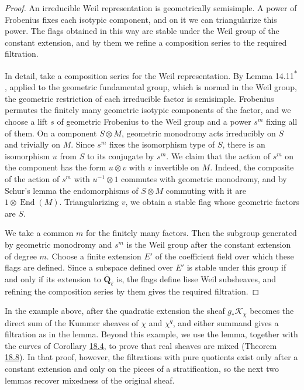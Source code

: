 \documentclass[11pt]{article}
\newcommand{\bpout}[1]{#1\textsuperscript{\hyperlink{bp-outside}{\ensuremath{\ast}}}}
\begin{document}
\begin{proof}[{Proof}]\label{bp19}%
An irreducible Weil representation is geometrically semisimple. A power of Frobenius fixes each isotypic component, and on it we can triangularize this power. The flags obtained in this way are stable under the Weil group of the constant extension, and by them we refine a composition series to the required filtration.

In detail, take a composition series for the Weil representation. By Lemma \bpout{14.11}, applied to the geometric fundamental group, which is normal in the Weil group, the geometric restriction of each irreducible factor is semisimple. Frobenius permutes the finitely many geometric isotypic components of the factor, and we choose a lift \(s\) of geometric Frobenius to the Weil group and a power \(s^m\) fixing all of them. On a component \(S\otimes M\), geometric monodromy acts irreducibly on \(S\) and trivially on \(M\). Since \(s^m\) fixes the isomorphism type of \(S\), there is an isomorphism \(u\) from \(S\) to its conjugate by \(s^m\). We claim that the action of \(s^m\) on the component has the form \(u\otimes v\) with \(v\) invertible on \(M\). Indeed, the composite of the action of \(s^m\) with \(u^{-1}\otimes1\) commutes with geometric monodromy, and by Schur's lemma the endomorphisms of \(S\otimes M\) commuting with it are \(1\otimes\operatorname{End}(M)\). Triangularizing \(v\), we obtain a stable flag whose geometric factors are \(S\).

We take a common \(m\) for the finitely many factors. Then the subgroup generated by geometric monodromy and \(s^m\) is the Weil group after the constant extension of degree \(m\). Choose a finite extension \(E'\) of the coefficient field over which these flags are defined. Since a subspace defined over \(E'\) is stable under this group if and only if its extension to \(\overline{\mathbf Q}_\ell\) is, the flags define lisse Weil subsheaves, and refining the composition series by them gives the required filtration.
\end{proof}

\label{bp20}%
In the example above, after the quadratic extension the sheaf \(g_*\mathcal K_\chi\) becomes the direct sum of the Kummer sheaves of \(\chi\) and \(\chi^q\), and either summand gives a filtration as in the lemma. Beyond this example, we use the lemma, together with the curves of Corollary \hyperref[bp14]{18.4}, to prove that real sheaves are mixed (Theorem \hyperref[bp25]{18.8}). In that proof, however, the filtrations with pure quotients exist only after a constant extension and only on the pieces of a stratification, so the next two lemmas recover mixedness of the original sheaf.
\end{document}
